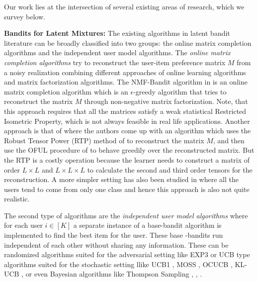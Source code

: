 Our work lies at the intersection of several existing areas of research, which we survey below. 

\textbf{Bandits for Latent Mixtures:} The existing algorithms in latent bandit literature can be broadly classified into two groups: the online matrix completion algorithms and the independent user model algorithms. The \textit{online matrix completion algorithms} try to reconstruct the user-item preference matrix $M$ from a noisy realization combining different approaches of online learning algorithms and matrix factorization algorithms. 
The NMF-Bandit algorithm in \citet{sen2016contextual} is an online matrix completion algorithm which is an $\epsilon$-greedy algorithm that tries to reconstruct the matrix $M$ through non-negative matrix factorization. Note, that this approach requires that all the matrices satisfy a weak statistical Restricted Isometric Property, which is not always feasible in real life applications. Another approach is that of \citet{gopalan2016low} where the authors come up with an algorithm which uses the Robust Tensor Power (RTP) method of 
\citet{anandkumar2014tensor} to reconstruct the matrix $M$, and then use the OFUL procedure of \citet{abbasi2011improved} to behave greedily over the reconstructed matrix. 
But the RTP is a costly operation because the learner needs to construct a matrix of order $L\times L$ and $L\times L \times L$ to calculate the second and third order tensors for the reconstruction.  A more simpler setting has also been studied in \citet{maillard2014latent} where all the users tend to come from only one class and hence this approach is also not quite realistic. 

The second type of algorithms are the \textit{independent user model algorithms} where for each user $i\in[K]$ a separate instance of a base-bandit algorithm is implemented to find the best item for the user. These base -bandits run independent of each other without sharing any information. These can be randomized algorithms suited for the adversarial setting like EXP3 \citep{auer2002nonstochastic} or UCB type algorithms suited for the stochastic setting llike UCB1 \citep{auer2002finite}, MOSS \citep{audibert2009minimax}, OCUCB \citep{lattimore2015optimally}, KL-UCB \citep{cappe2013kullback}, \citep{garivier2011kl} or even Bayesian algorithms like Thompson Sampling \citep{thompson1933likelihood}, \citep{thompson1935theory}, \citep{agrawal2012analysis}.

